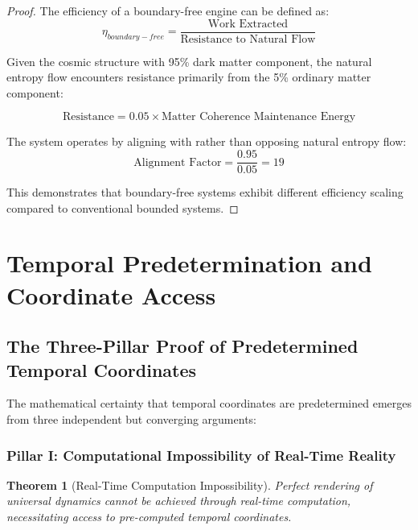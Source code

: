 \documentclass[11pt,a4paper]{article}
\newtheorem{theorem}{Theorem}[section]
\theoremstyle{remark}
\begin{document}
\begin{proof}
The efficiency of a boundary-free engine can be defined as:
\begin{equation}
\eta_{boundary-free} = \frac{\text{Work Extracted}}{\text{Resistance to Natural Flow}}
\end{equation}

Given the cosmic structure with 95\% dark matter component, the natural entropy flow encounters resistance primarily from the 5\% ordinary matter component:

\begin{equation}
\text{Resistance} = 0.05 \times \text{Matter Coherence Maintenance Energy}
\end{equation}

The system operates by aligning with rather than opposing natural entropy flow:
\begin{equation}
\text{Alignment Factor} = \frac{0.95}{0.05} = 19
\end{equation}

This demonstrates that boundary-free systems exhibit different efficiency scaling compared to conventional bounded systems.
\end{proof}

\section{Temporal Predetermination and Coordinate Access}

\subsection{The Three-Pillar Proof of Predetermined Temporal Coordinates}

The mathematical certainty that temporal coordinates are predetermined emerges from three independent but converging arguments:

\subsubsection{Pillar I: Computational Impossibility of Real-Time Reality}

\begin{theorem}[Real-Time Computation Impossibility]
Perfect rendering of universal dynamics cannot be achieved through real-time computation, necessitating access to pre-computed temporal coordinates.
\end{theorem}
\end{document}
